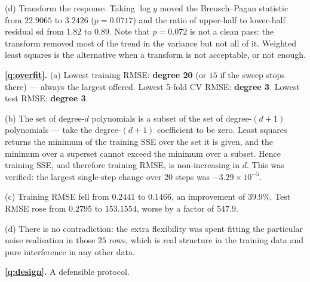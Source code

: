 \documentclass[11pt]{article}
\begin{document}
(d) Transform the response. Taking $\log y$ moved the Breusch--Pagan statistic
from $22.9065$ to $3.2426$ ($p = 0.0717$) and the ratio of upper-half to
lower-half residual sd from $1.82$ to $0.89$. Note that $p = 0.072$ is not a
clean pass: the transform removed most of the trend in the variance but not
all of it. Weighted least squares is the alternative when a transform is not
acceptable, or not enough.

\medskip
\textbf{\ref{q:overfit}.} (a) Lowest training RMSE: \textbf{degree 20} (or
$15$ if the sweep stops there) --- always the largest offered. Lowest 5-fold CV
RMSE: \textbf{degree 3}. Lowest test RMSE: \textbf{degree 3}.

(b) The set of degree-$d$ polynomials is a subset of the set of
degree-$(d{+}1)$ polynomials --- take the degree-$(d{+}1)$ coefficient to be
zero. Least squares returns the minimum of the training SSE over the set it is
given, and the minimum over a superset cannot exceed the minimum over a subset.
Hence training SSE, and therefore training RMSE, is non-increasing in $d$. This
was verified: the largest single-step change over $20$ steps was
$-3.29\times10^{-5}$.

(c) Training RMSE fell from $0.2441$ to $0.1466$, an improvement of
$\mathbf{39.9\%}$. Test RMSE rose from $0.2795$ to $153.1554$, worse by a
factor of $\mathbf{547.9}$.

(d) There is no contradiction: the extra flexibility was spent fitting the
particular noise realisation in those $25$ rows, which is real structure in the
training data and pure interference in any other data.

\medskip
\textbf{\ref{q:design}.} A defensible protocol.
\end{document}
